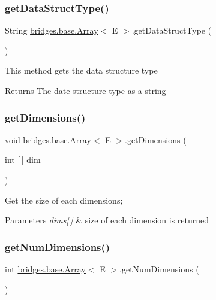 \subsubsection{\texorpdfstring{get\+Data\+Struct\+Type()}{getDataStructType()}}
{\footnotesize\ttfamily String \hyperlink{classbridges_1_1base_1_1_array}{bridges.\+base.\+Array}$<$ E $>$.get\+Data\+Struct\+Type (\begin{DoxyParamCaption}{ }\end{DoxyParamCaption})}

This method gets the data structure type

\begin{DoxyReturn}{Returns}
The date structure type as a string 
\end{DoxyReturn}
\hypertarget{classbridges_1_1base_1_1_array_af7aa7f3f18989af5f48a2b69cb7fb07d}{}\label{classbridges_1_1base_1_1_array_af7aa7f3f18989af5f48a2b69cb7fb07d} 
\subsubsection{\texorpdfstring{get\+Dimensions()}{getDimensions()}}
{\footnotesize\ttfamily void \hyperlink{classbridges_1_1base_1_1_array}{bridges.\+base.\+Array}$<$ E $>$.get\+Dimensions (\begin{DoxyParamCaption}\item[{int \mbox{[}$\,$\mbox{]}}]{dim }\end{DoxyParamCaption})}

Get the size of each dimensions;


\begin{DoxyParams}{Parameters}
{\em dims\mbox{[}$\,$\mbox{]}} & size of each dimension is returned \\
\hline
\end{DoxyParams}
\hypertarget{classbridges_1_1base_1_1_array_a808da9a62df3f0e7a905ec895a82087a}{}\label{classbridges_1_1base_1_1_array_a808da9a62df3f0e7a905ec895a82087a} 
\subsubsection{\texorpdfstring{get\+Num\+Dimensions()}{getNumDimensions()}}
{\footnotesize\ttfamily int \hyperlink{classbridges_1_1base_1_1_array}{bridges.\+base.\+Array}$<$ E $>$.get\+Num\+Dimensions (\begin{DoxyParamCaption}{ }\end{DoxyParamCaption})}

